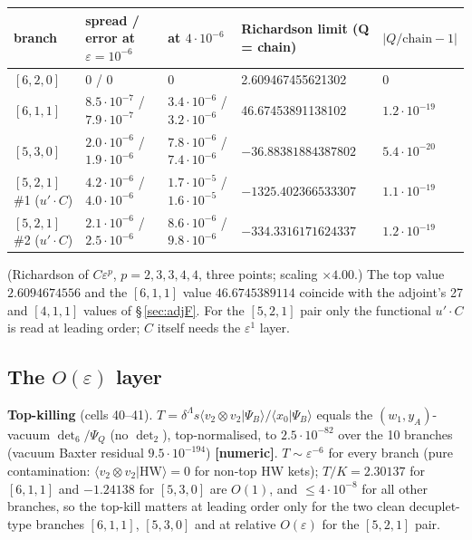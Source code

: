 \documentclass[10pt]{article}
\begin{document}
\begin{center}\footnotesize\setlength{\tabcolsep}{3pt}\begin{longtable}{@{}p{2.5cm}p{3.4cm}p{3.4cm}p{3.3cm}p{2.0cm}@{}}\toprule
\textbf{branch} & \textbf{spread / error at $\varepsilon=10^{-6}$} & \textbf{at $4\cdot10^{-6}$} & \textbf{Richardson limit (Q = chain)} & \textbf{$\lvert Q/\mathrm{chain}-1\rvert$} \\\midrule\endhead
$[6,2,0]$ & 0 / 0 & 0 & 2.609467455621302 & 0 \\
$[6,1,1]$ & $8.5\cdot10^{-7}$ / $7.9\cdot10^{-7}$ & $3.4\cdot10^{-6}$ / $3.2\cdot10^{-6}$ & 46.67453891138102 & $1.2\cdot10^{-19}$ \\
$[5,3,0]$ & $2.0\cdot10^{-6}$ / $1.9\cdot10^{-6}$ & $7.8\cdot10^{-6}$ / $7.4\cdot10^{-6}$ & $-36.88381884387802$ & $5.4\cdot10^{-20}$ \\
$[5,2,1]$ \#1 ($u'\cdot C$) & $4.2\cdot10^{-6}$ / $4.0\cdot10^{-6}$ & $1.7\cdot10^{-5}$ / $1.6\cdot10^{-5}$ & $-1325.402366533307$ & $1.1\cdot10^{-19}$ \\
$[5,2,1]$ \#2 ($u'\cdot C$) & $2.1\cdot10^{-6}$ / $2.5\cdot10^{-6}$ & $8.6\cdot10^{-6}$ / $9.8\cdot10^{-6}$ & $-334.3316171624337$ & $1.2\cdot10^{-19}$ \\
\bottomrule\end{longtable}\end{center}

(Richardson of $C\varepsilon^p$, $p=2,3,3,4,4$, three points; scaling $\times4.00$.) The top value $2.6094674556$ and the $[6,1,1]$ value $46.6745389114$ coincide with the adjoint's 27 and $[4,1,1]$ values of \S\,\ref{sec:adjF}. For the $[5,2,1]$ pair only the functional $u'\cdot C$ is read at leading order; $C$ itself needs the $\varepsilon^1$ layer.

\subsection{The $O(\varepsilon)$ layer}\label{sec:a310O}

\textbf{Top-killing} (cells 40--41). $T=\delta^\Lambda s\langle v_2\otimes v_2|\Psi_B\rangle/\langle x_0|\Psi_B\rangle$ equals the $(w_1,y_A)$-vacuum $\det_6/\Psi_Q$ (no $\det_2$), top-normalised, to $2.5\cdot10^{-82}$ over the 10 branches (vacuum Baxter residual $9.5\cdot10^{-194}$) \textbf{[numeric]}. $T\sim\varepsilon^{-6}$ for every branch (pure contamination: $\langle v_2\otimes v_2|\mathrm{HW}\rangle=0$ for non-top HW kets); $T/K=2.30137$ for $[6,1,1]$ and $-1.24138$ for $[5,3,0]$ are $O(1)$, and $\le4\cdot10^{-8}$ for all other branches, so the top-kill matters at leading order only for the two clean decuplet-type branches $[6,1,1]$, $[5,3,0]$ and at relative $O(\varepsilon)$ for the $[5,2,1]$ pair.
\end{document}
